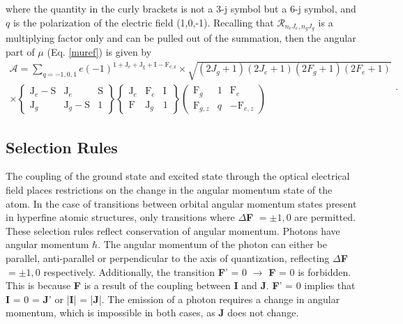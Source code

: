 where the quantity in the curly brackets is not a 3-j symbol but a 6-j symbol, and $q$ is the polarization of the electric field (1,0,-1). Recalling that $\mathcal{R}_{n_e J_e, n_g J_g}$ is a multiplying factor only and can be pulled out of the summation, then the angular part of $\mu$ (Eq. \ref{muref}) is given by
\begin{equation}
\begin{split}
\mathcal{A} = \sum_{q = -1,0,1} e (-1)^{\mathrm{1+J_e+J_g+I-F_{e,z}}}
\times \sqrt{(2J_g+1)(2J_e+1)(2F_g+1)(2F_e+1)}\\
\times \left\lbrace
\begin{matrix}
\mathrm{J}_e-\mathrm{S} & \mathrm{J}_e & \mathrm{S}\\
\mathrm{J}_g & \mathrm{J}_g-\mathrm{S}& 1
\end{matrix}
\right\rbrace
\left\lbrace
\begin{matrix}
\mathrm{J}_e & \mathrm{F}_e & \mathrm{I}\\
\mathrm{F} & \mathrm{J}_g &1
\end{matrix}
\right\rbrace
\left(
\begin{matrix}
\mathrm{F}_g & 1 & \mathrm{F}_e\\
\mathrm{F}_{g,z} & q &-\mathrm{F}_{e,z}
\end{matrix}
\right)
\end{split}.
\end{equation}


\subsection{Selection Rules}
The coupling of the ground state and excited state through the optical electrical field places restrictions on the change in the angular momentum state of the atom. In the case of transitions between orbital angular momentum states present in hyperfine atomic structures, only transitions where $\Delta$\textbf{F}  $=\pm1,0$ are permitted. These selection rules reflect conservation of angular momentum. Photons have angular momentum $\hbar$. The angular momentum of the photon can either be parallel, anti-parallel or perpendicular to the axis of quantization, reflecting $\Delta$\textbf{F}$=\pm1,0$ respectively. Additionally, the transition \textbf{F}' = 0 $\rightarrow$ \textbf{F} = 0 is forbidden. This is because \textbf{F} is a result of the coupling between \textbf{I} and \textbf{J}. \textbf{F}' = 0 implies that \textbf{I} = 0 = \textbf{J}' or |\textbf{I}| = |\textbf{J}|. The emission of a photon requires a change in angular momentum, which is impossible in both cases, as \textbf{J} does not change\cite{TomT}.

